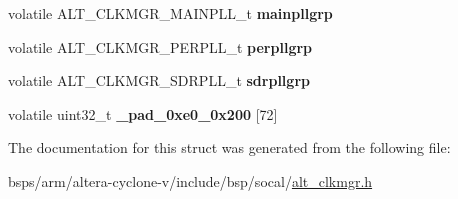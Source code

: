\begin{DoxyCompactItemize}
volatile A\+L\+T\+\_\+\+C\+L\+K\+M\+G\+R\+\_\+\+M\+A\+I\+N\+P\+L\+L\+\_\+t {\bfseries mainpllgrp}
\item 
\mbox{\label{structALT__CLKMGR__s_a66b74d40d368c1a251b70e7dc679d837}} 
volatile A\+L\+T\+\_\+\+C\+L\+K\+M\+G\+R\+\_\+\+P\+E\+R\+P\+L\+L\+\_\+t {\bfseries perpllgrp}
\item 
\mbox{\label{structALT__CLKMGR__s_a5242c5a5d5abeb5346ce689afc761816}} 
volatile A\+L\+T\+\_\+\+C\+L\+K\+M\+G\+R\+\_\+\+S\+D\+R\+P\+L\+L\+\_\+t {\bfseries sdrpllgrp}
\item 
\mbox{\label{structALT__CLKMGR__s_ab7ad22b508729eadc77b3cc8254d0c04}} 
volatile uint32\+\_\+t {\bfseries \+\_\+pad\+\_\+0xe0\+\_\+0x200} \mbox{[}72\mbox{]}
\end{DoxyCompactItemize}


The documentation for this struct was generated from the following file\+:\begin{DoxyCompactItemize}
\item 
bsps/arm/altera-\/cyclone-\/v/include/bsp/socal/\mbox{\hyperlink{alt__clkmgr_8h}{alt\+\_\+clkmgr.\+h}}\end{DoxyCompactItemize}
